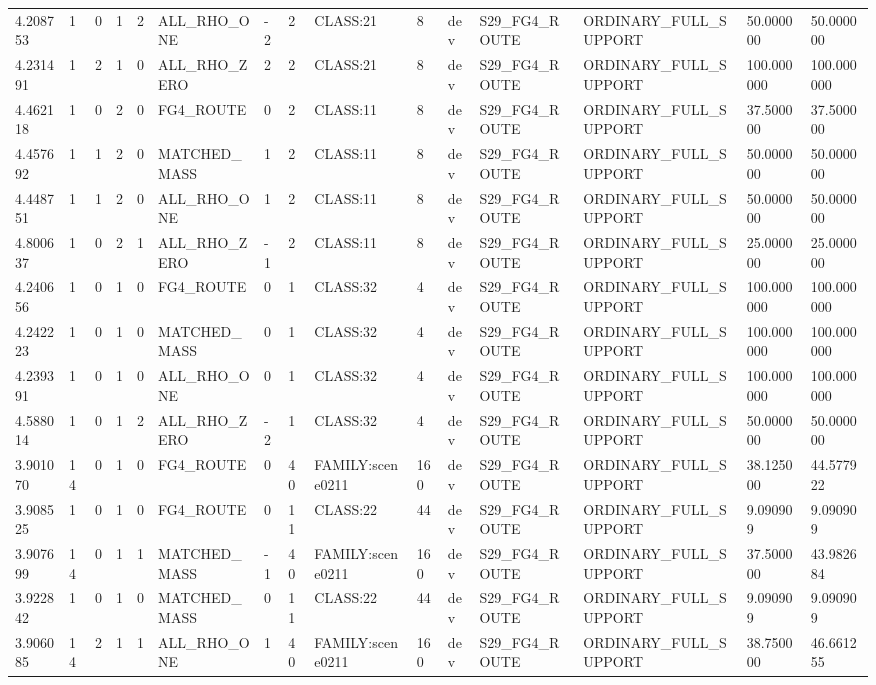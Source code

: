 \begin{tabular}{lllllllllllllll}
4.208753 & 1 & 0 & 1 & 2 & ALL\_RHO\_ONE & -2 & 2 & CLASS:21 & 8 & dev & S29\_FG4\_ROUTE & ORDINARY\_FULL\_SUPPORT & 50.000000 & 50.000000 \\
4.231491 & 1 & 2 & 1 & 0 & ALL\_RHO\_ZERO & 2 & 2 & CLASS:21 & 8 & dev & S29\_FG4\_ROUTE & ORDINARY\_FULL\_SUPPORT & 100.000000 & 100.000000 \\
4.462118 & 1 & 0 & 2 & 0 & FG4\_ROUTE & 0 & 2 & CLASS:11 & 8 & dev & S29\_FG4\_ROUTE & ORDINARY\_FULL\_SUPPORT & 37.500000 & 37.500000 \\
4.457692 & 1 & 1 & 2 & 0 & MATCHED\_MASS & 1 & 2 & CLASS:11 & 8 & dev & S29\_FG4\_ROUTE & ORDINARY\_FULL\_SUPPORT & 50.000000 & 50.000000 \\
4.448751 & 1 & 1 & 2 & 0 & ALL\_RHO\_ONE & 1 & 2 & CLASS:11 & 8 & dev & S29\_FG4\_ROUTE & ORDINARY\_FULL\_SUPPORT & 50.000000 & 50.000000 \\
4.800637 & 1 & 0 & 2 & 1 & ALL\_RHO\_ZERO & -1 & 2 & CLASS:11 & 8 & dev & S29\_FG4\_ROUTE & ORDINARY\_FULL\_SUPPORT & 25.000000 & 25.000000 \\
4.240656 & 1 & 0 & 1 & 0 & FG4\_ROUTE & 0 & 1 & CLASS:32 & 4 & dev & S29\_FG4\_ROUTE & ORDINARY\_FULL\_SUPPORT & 100.000000 & 100.000000 \\
4.242223 & 1 & 0 & 1 & 0 & MATCHED\_MASS & 0 & 1 & CLASS:32 & 4 & dev & S29\_FG4\_ROUTE & ORDINARY\_FULL\_SUPPORT & 100.000000 & 100.000000 \\
4.239391 & 1 & 0 & 1 & 0 & ALL\_RHO\_ONE & 0 & 1 & CLASS:32 & 4 & dev & S29\_FG4\_ROUTE & ORDINARY\_FULL\_SUPPORT & 100.000000 & 100.000000 \\
4.588014 & 1 & 0 & 1 & 2 & ALL\_RHO\_ZERO & -2 & 1 & CLASS:32 & 4 & dev & S29\_FG4\_ROUTE & ORDINARY\_FULL\_SUPPORT & 50.000000 & 50.000000 \\
3.901070 & 14 & 0 & 1 & 0 & FG4\_ROUTE & 0 & 40 & FAMILY:scene0211 & 160 & dev & S29\_FG4\_ROUTE & ORDINARY\_FULL\_SUPPORT & 38.125000 & 44.577922 \\
3.908525 & 1 & 0 & 1 & 0 & FG4\_ROUTE & 0 & 11 & CLASS:22 & 44 & dev & S29\_FG4\_ROUTE & ORDINARY\_FULL\_SUPPORT & 9.090909 & 9.090909 \\
3.907699 & 14 & 0 & 1 & 1 & MATCHED\_MASS & -1 & 40 & FAMILY:scene0211 & 160 & dev & S29\_FG4\_ROUTE & ORDINARY\_FULL\_SUPPORT & 37.500000 & 43.982684 \\
3.922842 & 1 & 0 & 1 & 0 & MATCHED\_MASS & 0 & 11 & CLASS:22 & 44 & dev & S29\_FG4\_ROUTE & ORDINARY\_FULL\_SUPPORT & 9.090909 & 9.090909 \\
3.906085 & 14 & 2 & 1 & 1 & ALL\_RHO\_ONE & 1 & 40 & FAMILY:scene0211 & 160 & dev & S29\_FG4\_ROUTE & ORDINARY\_FULL\_SUPPORT & 38.750000 & 46.661255 \\

\end{tabular}
